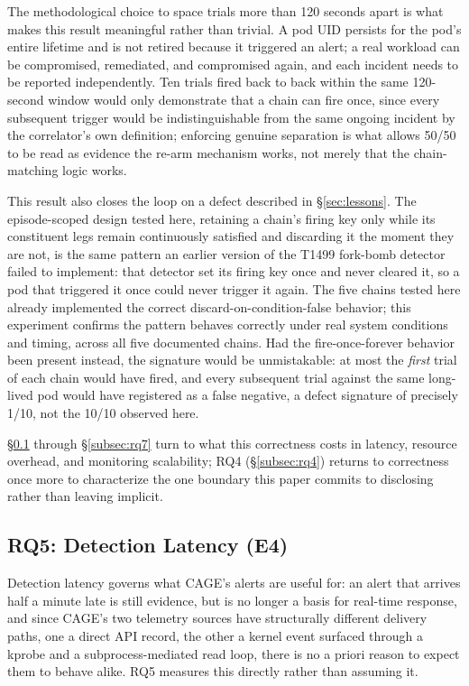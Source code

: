 \documentclass{ieeeaccess}
\begin{document}
The methodological choice to space trials more than 120 seconds apart
is what makes this result meaningful rather than trivial. A pod UID
persists for the pod's entire lifetime and is not retired because it
triggered an alert; a real workload can be compromised, remediated,
and compromised again, and each incident needs to be reported
independently. Ten trials fired back to back within the same
120-second window would only demonstrate that a chain can fire once,
since every subsequent trigger would be indistinguishable from the
same ongoing incident by the correlator's own definition; enforcing
genuine separation is what allows 50/50 to be read as evidence the
re-arm mechanism works, not merely that the chain-matching logic
works.

This result also closes the loop on a defect described in \S\ref{sec:lessons}.
The episode-scoped design tested here, retaining a chain's firing key
only while its constituent legs remain continuously satisfied and
discarding it the moment they are not, is the same pattern an earlier
version of the T1499 fork-bomb detector failed to implement: that
detector set its firing key once and never cleared it, so a pod that
triggered it once could never trigger it again. The five chains tested
here already implemented the correct discard-on-condition-false
behavior; this experiment confirms the pattern behaves correctly under
real system conditions and timing, across all five documented chains.
Had the fire-once-forever behavior been present instead, the signature
would be unmistakable: at most the \emph{first} trial of each chain
would have fired, and every subsequent trial against the same
long-lived pod would have registered as a false negative, a defect
signature of precisely 1/10, not the 10/10 observed here.

\S\ref{subsec:rq5} through \S\ref{subsec:rq7} turn to what this correctness costs in
latency, resource overhead, and monitoring scalability; RQ4
(\S\ref{subsec:rq4}) returns to correctness once more to characterize the
one boundary this paper commits to disclosing rather than leaving
implicit.

\subsection{RQ5: Detection Latency (E4)}
\label{subsec:rq5}

Detection latency governs what CAGE's alerts are useful for: an alert
that arrives half a minute late is still evidence, but is no longer a
basis for real-time response, and since CAGE's two telemetry sources
have structurally different delivery paths, one a direct API record,
the other a kernel event surfaced through a kprobe and a
subprocess-mediated read loop, there is no a priori reason to expect
them to behave alike. RQ5 measures this directly rather than assuming
it.
\end{document}
